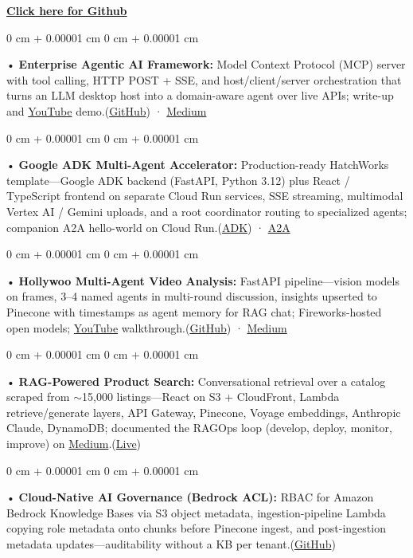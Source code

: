 \documentclass[10pt, letterpaper]{article}
\newenvironment{onecolentry}{
    \begin{adjustwidth}{
        0 cm + 0.00001 cm
    }{
        0 cm + 0.00001 cm
    }
}{
    \end{adjustwidth}
} %
\begin{document}
\textbf{\href{https://github.com/daedalus-s}{Click here for Github}}
\begin{onecolentry}
     • \textbf{Enterprise Agentic AI Framework:} Model Context Protocol (MCP) server with tool calling, HTTP POST + SSE, and host/client/server orchestration that turns an LLM desktop host into a domain-aware agent over live APIs; write-up and \href{https://www.youtube.com/watch?v=op2gTYyFb5U}{YouTube} demo.(\href{https://github.com/daedalus-s/dota2-mcp-server}{GitHub}) · \href{https://medium.com/@sreenikethaathreya/get-good-at-using-ai-noob-5d2576203112}{Medium}
\end{onecolentry}
\begin{onecolentry}
     • \textbf{Google ADK Multi-Agent Accelerator:} Production-ready HatchWorks template---Google ADK backend (FastAPI, Python 3.12) plus React / TypeScript frontend on separate Cloud Run services, SSE streaming, multimodal Vertex AI / Gemini uploads, and a root coordinator routing to specialized agents; companion A2A hello-world on Cloud Run.(\href{https://github.com/sreenikethaathreya-hw/adksolutionsaccelerator}{ADK}) · \href{https://github.com/daedalus-s/szns-adk-a2a}{A2A}
\end{onecolentry}
\begin{onecolentry}
     • \textbf{Hollywoo Multi-Agent Video Analysis:} FastAPI pipeline---vision models on frames, 3--4 named agents in multi-round discussion, insights upserted to Pinecone with timestamps as agent memory for RAG chat; Fireworks-hosted open models; \href{https://www.youtube.com/watch?v=KBs_3V0OAgU}{YouTube} walkthrough.(\href{https://github.com/daedalus-s/fireworks-video-discussion}{GitHub}) · \href{https://medium.com/@sreenikethaathreya/hollywoo-ai-video-analysis-5eae37ca7e16}{Medium}
\end{onecolentry}
\begin{onecolentry}
     • \textbf{RAG-Powered Product Search:} Conversational retrieval over a catalog scraped from {$\sim$}15,000 listings---React on S3 + CloudFront, Lambda retrieve/generate layers, API Gateway, Pinecone, Voyage embeddings, Anthropic Claude, DynamoDB; documented the RAGOps loop (develop, deploy, monitor, improve) on \href{https://medium.com/@sreenikethaathreya/from-rags-to-riches-bba8a671d5e6}{Medium}.(\href{https://prorecsa.co}{Live})
\end{onecolentry}
\begin{onecolentry}
     • \textbf{Cloud-Native AI Governance (Bedrock ACL):} RBAC for Amazon Bedrock Knowledge Bases via S3 object metadata, ingestion-pipeline Lambda copying role metadata onto chunks before Pinecone ingest, and post-ingestion metadata updates---auditability without a KB per tenant.(\href{https://github.com/daedalus-s/bedrock-acl-metadata}{GitHub})
\end{onecolentry}
\vspace{2 pt }
        \vspace{2 pt }
\end{document}
